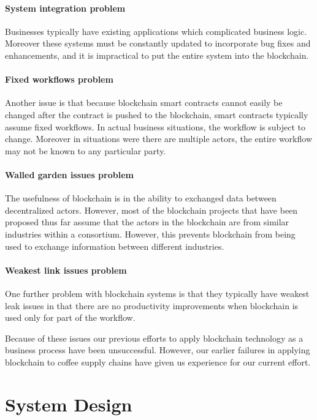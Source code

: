 \documentclass[journal]{IEEEtran}
\begin{document}
\paragraph {System integration problem} Businesses typically have existing
applications which complicated business logic.  Moreover these systems
must be constantly updated to incorporate bug fixes and enhancements,
and it is impractical to put the entire system into the blockchain.

\paragraph {Fixed workflows problem} Another issue is that because blockchain
smart contracts cannot easily be changed after the contract is pushed
to the blockchain, smart contracts typically assume fixed workflows.
In actual business situations, the workflow is subject to change.
Moreover in situations were there are multiple actors, the entire
workflow may not be known to any particular party.

\paragraph {Walled garden issues problem} The usefulness of blockchain is in
the ability to exchanged data between decentralized actors.  However,
most of the blockchain projects that have been proposed thus far
assume that the actors in the blockchain are from similar industries
within a consortium.  However, this prevents blockchain from being
used to exchange information between different industries.

\paragraph {Weakest link issues problem} One further problem with blockchain
systems is that they typically have weakest leak issues in that there
are no productivity improvements when blockchain is used only for part
of the workflow.

Because of these issues our previous efforts to apply blockchain
technology as a business process have been unsuccessful.  However,
our earlier failures in applying blockchain to coffee supply chains
have given us experience for our current effort.

\section{System Design}
\end{document}
